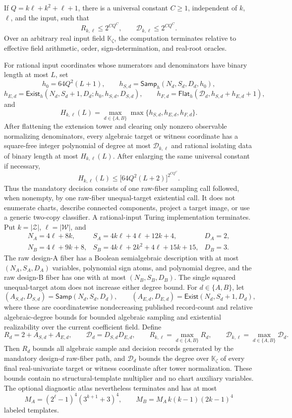 If \(Q=k\ell+k^2+\ell+1\), there is a universal constant \(C\geq1\), independent of \(k\), \(\ell\), and the input, such that
\[
R_{k,\ell}\leq2^{CQ^C},
\qquad
\mathcal D_{k,\ell}\leq2^{CQ^C}.
\]
Over an arbitrary real input field \(\mathbb K_{\zeta}\), the computation terminates relative to effective field arithmetic, order, sign-determination, and real-root oracles.

For rational input coordinates whose numerators and denominators have binary length at most \(L\), set
\[
h_0=64Q^2(L+1),
\qquad
h_{S,d}=\mathsf{Samp}_h(N_d,S_d,D_d,h_0),
\]
\[
h_{E,d}=\mathsf{Exist}_h(N_d,S_d+1,D_d;h_0,h_{S,d},D_{S,d}),
\qquad
h_{F,d}=\mathsf{Flat}_h(\mathcal D_d,h_{S,d}+h_{E,d}+1),
\]
and
\[
H_{k,\ell}(L)=
\max_{d\in\{A,B\}}\max\{h_{S,d},h_{E,d},h_{F,d}\}.
\]
After flattening the extension tower and clearing only nonzero observable normalizing denominators, every algebraic target or witness coordinate has a square-free integer polynomial of degree at most \(\mathcal D_{k,\ell}\) and rational isolating data of binary length at most \(H_{k,\ell}(L)\).  After enlarging the same universal constant if necessary,
\[
H_{k,\ell}(L)
\leq
\bigl[64Q^2(L+2)\bigr]^{2^{CQ^C}}.
\]
Thus the mandatory decision consists of one raw-fiber sampling call followed, when nonempty, by one raw-fiber unequal-target existential call.  It does not enumerate charts, describe connected components, project a target image, or use a generic two-copy classifier.  A rational-input Turing implementation terminates.
Put \(k=|\mathcal Z|\), \(\ell=|\mathcal W|\), and
\[
\begin{array}{lll}
N_A=4\ell+8k,&
S_A=4k\ell+4\ell+12k+4,&
D_A=2,\\
N_B=4\ell+9k+8,&
S_B=4k\ell+2k^2+4\ell+15k+15,&
D_B=3.
\end{array}
\]
The raw design-A fiber has a Boolean semialgebraic description with at most \((N_A,S_A,D_A)\) variables, polynomial sign atoms, and polynomial degree, and the raw design-B fiber has one with at most \((N_B,S_B,D_B)\).  The single squared unequal-target atom does not increase either degree bound.  For \(d\in\{A,B\}\), let
\[
(A_{S,d},D_{S,d})=\mathsf{Samp}(N_d,S_d,D_d),
\qquad
(A_{E,d},D_{E,d})=\mathsf{Exist}(N_d,S_d+1,D_d),
\]
where these are coordinatewise nondecreasing published record-count and relative algebraic-degree bounds for bounded algebraic sampling and existential realizability over the current coefficient field.  Define
\[
R_d=2+A_{S,d}+A_{E,d},
\qquad
\mathcal D_d=D_{S,d}D_{E,d},
\qquad
R_{k,\ell}=\max_{d\in\{A,B\}}R_d,
\qquad
\mathcal D_{k,\ell}=\max_{d\in\{A,B\}}\mathcal D_d.
\]
Then \(R_d\) bounds all algebraic sample and decision records generated by the mandatory design-\(d\) raw-fiber path, and \(\mathcal D_d\) bounds the degree over \(\mathbb K_{\zeta}\) of every final real-univariate target or witness coordinate after tower normalization.  These bounds contain no structural-template multiplier and no chart auxiliary variables.  The optional diagnostic atlas nevertheless terminates and has at most
\[
M_A=(2^{\ell}-1)^4(3^{k+1}+3)^4,
\qquad
M_B=M_A\,k(k-1)(2k-1)^4
\]
labeled templates.

